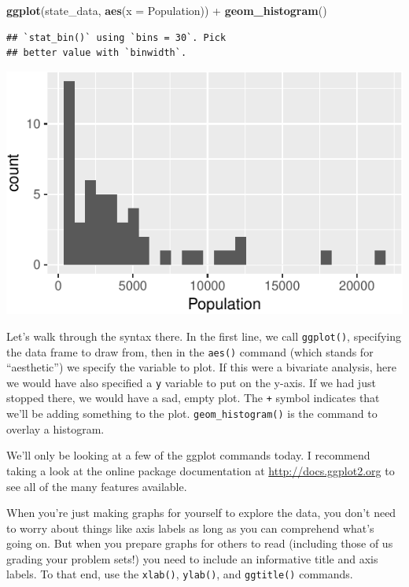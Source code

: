 \documentclass[12pt,oneside,openany]{tufte-book}
\newenvironment{Shaded}{}{}
\newcommand{\KeywordTok}[1]{\textcolor[rgb]{0.00,0.44,0.13}{\textbf{{#1}}}}
\newcommand{\DataTypeTok}[1]{\textcolor[rgb]{0.56,0.13,0.00}{{#1}}}
\newcommand{\StringTok}[1]{\textcolor[rgb]{0.25,0.44,0.63}{{#1}}}
\newcommand{\NormalTok}[1]{{#1}}
\begin{document}
\begin{Shaded}
\begin{Highlighting}[]
\KeywordTok{ggplot}\NormalTok{(state_data, }\KeywordTok{aes}\NormalTok{(}\DataTypeTok{x =} \NormalTok{Population)) +}\StringTok{ }\KeywordTok{geom_histogram}\NormalTok{()}
\end{Highlighting}
\end{Shaded}

\begin{verbatim}
## `stat_bin()` using `bins = 30`. Pick
## better value with `binwidth`.
\end{verbatim}

\includegraphics{pdaps_files/figure-latex/histogram-1}

Let's walk through the syntax there. In the first line, we call
\texttt{ggplot()}, specifying the data frame to draw from, then in the
\texttt{aes()} command (which stands for ``aesthetic'') we specify the
variable to plot. If this were a bivariate analysis, here we would have
also specified a \texttt{y} variable to put on the y-axis. If we had
just stopped there, we would have a sad, empty plot. The \texttt{+}
symbol indicates that we'll be adding something to the plot.
\texttt{geom\_histogram()} is the command to overlay a histogram.

We'll only be looking at a few of the ggplot commands today. I recommend
taking a look at the online package documentation at
\url{http://docs.ggplot2.org} to see all of the many features available.

When you're just making graphs for yourself to explore the data, you
don't need to worry about things like axis labels as long as you can
comprehend what's going on. But when you prepare graphs for others to
read (including those of us grading your problem sets!) you need to
include an informative title and axis labels. To that end, use the
\texttt{xlab()}, \texttt{ylab()}, and \texttt{ggtitle()} commands.
\end{document}
